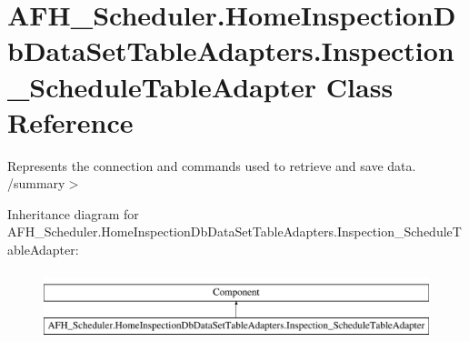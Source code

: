 \section{A\+F\+H\+\_\+\+Scheduler.\+Home\+Inspection\+Db\+Data\+Set\+Table\+Adapters.\+Inspection\+\_\+\+Schedule\+Table\+Adapter Class Reference}
\label{class_a_f_h___scheduler_1_1_home_inspection_db_data_set_table_adapters_1_1_inspection___schedule_table_adapter}


Represents the connection and commands used to retrieve and save data. /summary$>$  


Inheritance diagram for A\+F\+H\+\_\+\+Scheduler.\+Home\+Inspection\+Db\+Data\+Set\+Table\+Adapters.\+Inspection\+\_\+\+Schedule\+Table\+Adapter\+:\begin{figure}[H]
\begin{center}
\leavevmode
\includegraphics[height=2.000000cm]{class_a_f_h___scheduler_1_1_home_inspection_db_data_set_table_adapters_1_1_inspection___schedule_table_adapter}
\end{center}
\end{figure}
